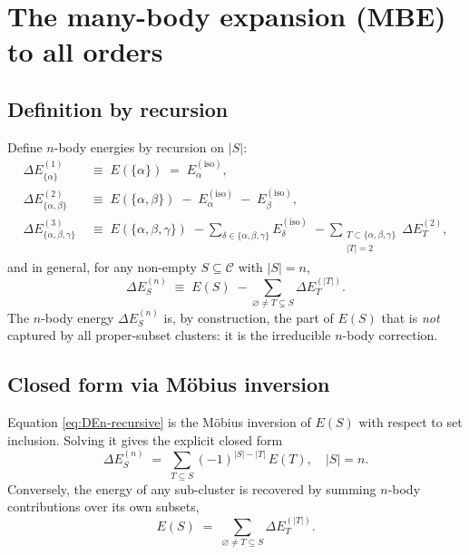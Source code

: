 \documentclass[11pt,a4paper]{article}
\newcommand{\Eiso}{E^{(\mathrm{iso})}}
\begin{document}
\section{The many-body expansion (MBE) to all orders}
\label{sec:MBE}

\subsection{Definition by recursion}

Define $n$-body energies by recursion on $|S|$:
\begin{align}
\Delta E^{(1)}_{\{\alpha\}} &\;\equiv\; E(\{\alpha\}) \;=\; \Eiso_\alpha,
\label{eq:DE1} \\[2pt]
\Delta E^{(2)}_{\{\alpha,\beta\}} &\;\equiv\; E(\{\alpha,\beta\})
   \;-\; \Eiso_\alpha \;-\; \Eiso_\beta,
\label{eq:DE2} \\[2pt]
\Delta E^{(3)}_{\{\alpha,\beta,\gamma\}} &\;\equiv\; E(\{\alpha,\beta,\gamma\})
   \;-\!\!\!\sum_{\delta \in \{\alpha,\beta,\gamma\}}\!\!\! \Eiso_\delta
   \;-\!\!\!\!\!\sum_{\substack{T \subset \{\alpha,\beta,\gamma\} \\ |T|=2}}
        \!\!\!\!\!\Delta E^{(2)}_T,
\label{eq:DE3}
\end{align}
and in general, for any non-empty $S \subseteq \mathcal{C}$ with $|S|=n$,
\begin{equation}
\boxed{\;
\Delta E^{(n)}_{S}
\;\equiv\; E(S)
\;-\!\! \sum_{\varnothing \ne T \subsetneq S} \!\! \Delta E^{(|T|)}_{T}.
\;}
\label{eq:DEn-recursive}
\end{equation}
The $n$-body energy $\Delta E^{(n)}_S$ is, by construction, the part of $E(S)$
that is \emph{not} captured by all proper-subset clusters: it is the irreducible
$n$-body correction.

\subsection{Closed form via M\"obius inversion}

Equation \cref{eq:DEn-recursive} is the M\"obius inversion of $E(S)$ with
respect to set inclusion. Solving it gives the explicit closed form
\begin{equation}
\boxed{\;
\Delta E^{(n)}_{S}
\;=\; \sum_{T \subseteq S} (-1)^{|S|-|T|} \, E(T),
\quad |S|=n.
\;}
\label{eq:DEn-mobius}
\end{equation}
Conversely, the energy of any sub-cluster is recovered by summing $n$-body
contributions over its own subsets,
\begin{equation}
E(S) \;=\; \sum_{\varnothing \ne T \subseteq S} \Delta E^{(|T|)}_{T}.
\label{eq:E-from-DE}
\end{equation}
\end{document}
